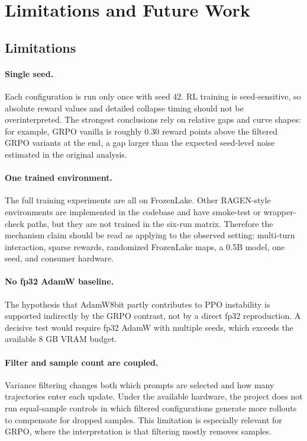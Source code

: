 \section{Limitations and Future Work}
\label{sec:discussion}

\subsection{Limitations}

\paragraph{Single seed.}
Each configuration is run only once with seed 42. RL training is seed-sensitive, so absolute reward values and detailed collapse timing should not be overinterpreted. The strongest conclusions rely on relative gaps and curve shapes: for example, GRPO vanilla is roughly 0.30 reward points above the filtered GRPO variants at the end, a gap larger than the expected seed-level noise estimated in the original analysis.

\paragraph{One trained environment.}
The full training experiments are all on FrozenLake. Other RAGEN-style environments are implemented in the codebase and have smoke-test or wrapper-check paths, but they are not trained in the six-run matrix. Therefore the mechanism claim should be read as applying to the observed setting: multi-turn interaction, sparse rewards, randomized FrozenLake maps, a 0.5B model, one seed, and consumer hardware.

\paragraph{No fp32 AdamW baseline.}
The hypothesis that AdamW8bit partly contributes to PPO instability is supported indirectly by the GRPO contrast, not by a direct fp32 reproduction. A decisive test would require fp32 AdamW with multiple seeds, which exceeds the available 8 GB VRAM budget.

\paragraph{Filter and sample count are coupled.}
Variance filtering changes both which prompts are selected and how many trajectories enter each update. Under the available hardware, the project does not run equal-sample controls in which filtered configurations generate more rollouts to compensate for dropped samples. This limitation is especially relevant for GRPO, where the interpretation is that filtering mostly removes samples.


